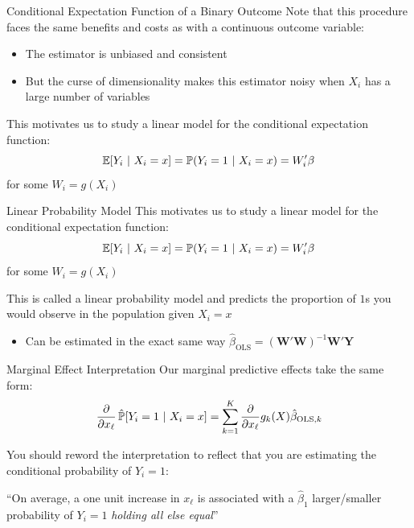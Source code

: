 \documentclass[aspectratio=169,t,11pt,table]{beamer}
\begin{document}
\begin{frame}{Conditional Expectation Function of a Binary Outcome}
  Note that this procedure faces the same benefits and costs as with a continuous outcome variable:
  \begin{itemize}
    \item The estimator is unbiased and consistent 
    
    \item But the curse of dimensionality makes this estimator noisy when $X_i$ has a large number of variables
  \end{itemize}
  
  \pause
  \bigskip
  This motivates us to study a linear model for the conditional expectation function:
  $$
    \expec{Y_i}{X_i = x} = \prob{Y_i = 1}{X_i = x} = W_i' \beta
  $$
  for some $W_i = g(X_i)$
\end{frame}

\begin{frame}{Linear Probability Model}
  This motivates us to study a linear model for the conditional expectation function:
  $$
    \expec{Y_i}{X_i = x} = \prob{Y_i = 1}{X_i = x} = W_i' \beta
  $$
  for some $W_i = g(X_i)$

  \bigskip\bigskip
  This is called a \alert{linear probability model} and predicts the proportion of $1$s you would observe in the population given $X_i = x$
  \begin{itemize}
    \item Can be estimated in the exact same way $\hat{\beta}_{\text{OLS}} = \left( \bm{W}' \bm{W} \right)^{-1} \bm{W}' \bm{Y}$
  \end{itemize}
\end{frame}

\begin{frame}{Marginal Effect Interpretation}
  Our marginal predictive effects take the same form:
  $$
    \frac{\partial}{\partial x_\ell} \probhat{Y_i = 1}{X_i = x} = \sum_{k=1}^K \frac{\partial}{\partial x_\ell} g_{k}(X) \hat{\beta}_{\text{OLS}, k}
  $$
  
  \bigskip
  You should reword the interpretation to reflect that you are estimating the conditional probability of $Y_i = 1$:

  \begin{tcolorbox}[boxrule = 0pt, frame hidden, sharp corners, enhanced, borderline west = {2pt}{0pt}{zinc600}, interior hidden]
    ``On average, a one unit increase in $x_\ell$ is associated with a $\hat{\beta}_1$ larger/smaller probability of $Y_i = 1$ \emph{\color{blue} holding all else equal}''
  \end{tcolorbox}
\end{frame}
\end{document}
